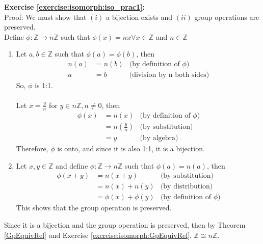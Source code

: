 \noindent\textbf{Exercise \ref{exercise:isomorph:iso_prac1}:}
\\
Proof:  We must show that $(i)$ a bijection exists and $(ii)$ group operations are preserved.
\\
Define $\phi: {\mathbb Z} \rightarrow n{\mathbb Z}$ such that $\phi(x) = nx \forall x \in {\mathbb Z}$ and $n \in {\mathbb Z}$
\begin{enumerate}[($i$)]
\item
Let $a, b \in {\mathbb Z}$ such that $\phi(a) = \phi(b)$, then
\begin{align*}
n(a) &= n(b) &\text{(by definition of\ } \phi)
\\
a &= b &\text{(division by n both sides)}
\end{align*}
So, $\phi$ is 1:1.
\\
\\
Let $x = \frac{y}{n}$ for $y \in n{\mathbb Z}, n \neq 0$, then
\begin{align*}
\phi(x) &= n(x) &\text{(by definition of\ } \phi)
\\
&= n\left(\frac{y}{n}\right) &\text{(by substitution)}
\\
&= y &\text{(by algebra)}
\end{align*}
Therefore, $\phi$ is onto, and since it is also 1:1, it is a bijection.

\item
Let $x, y \in {\mathbb Z}$ and define $\phi: {\mathbb Z} \rightarrow n{\mathbb Z}$ such that $\phi(a) = n(a)$, then
\\
\begin{align*}
\phi(x + y) &= n(x + y) &\text{(by substitution)}
\\
&= n(x) + n(y) &\text{(by distribution)}
\\
&= \phi(x) + \phi(y) &\text{(by definition of\ } \phi)
\end{align*}
This shows that the group operation is preserved.  
\end{enumerate}
Since it is a bijection and the group operation is preserved, then by Theorem \ref{GpEquivRel} and Exercise \ref{exercise:isomorph:GpEquivRel}, ${\mathbb Z} \cong n{\mathbb Z}$.
\\
\\

